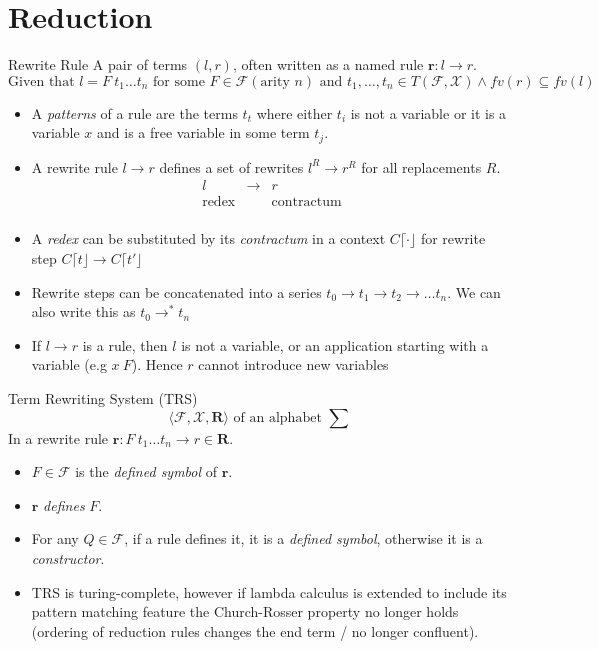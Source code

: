 \section{Reduction}
\begin{definitionbox}{Rewrite Rule}
	A pair of terms $(l, r)$, often written as a named rule $\mathbf{r} : l \to r$.
	\[\text{Given that }l = F \ t_1 \dots t_n \text{ for some }F \in \mathcal{F} (\text{arity }n) \text{ and } t_1, \dots , t_n \in T(\mathcal{F}, \mathcal{X}) \land fv(r) \subseteq fv(l)\]
	\begin{itemize}
		\item A \textit{patterns} of a rule are the terms $t_t$ where either $t_i$ is not a variable or it is a variable $x$ and is a free variable in some term $t_j$.
		\item {A rewrite rule $l \to r$ defines a set of rewrites $l^R \to r^R$ for all replacements $R$.
		      \[\begin{matrix}
				      l            & \to & r                 \\
				      \text{redex} &     & \text{contractum} \\
			      \end{matrix}\]}
		\item A \textit{redex} can be substituted by its \textit{contractum} in a context $C\lceil \cdot \rfloor$ for rewrite step $C\lceil t \rfloor \to C \lceil t' \rfloor$
		\item Rewrite steps can be concatenated into a series $t_0 \to t_1 \to t_2 \to \dots t_n$. We can also write this as $t_0 \to^* t_n$
		\item If $l \to r$ is a rule, then $l$ is not a variable, or an application starting with a variable (e.g $x \ F$). Hence $r$ cannot introduce new variables
	\end{itemize}
\end{definitionbox}

\begin{definitionbox}{Term Rewriting System (TRS)}
	\[\langle \mathcal{F}, \mathcal{X}, \mathbf{R} \rangle \text{ of an alphabet } \sum\]
	In a rewrite rule $\mathbf{r} : F \ t_1 \dots t_n \to r \in \mathbf{R}$.
	\begin{itemize}
		\item $F \in \mathcal{F}$ is the \textit{defined symbol} of $\mathbf{r}$.
		\item $\mathbf{r}$ \textit{defines} $F$.
		\item For any $Q \in \mathcal{F}$, if a rule defines it, it is a \textit{defined symbol}, otherwise it is a \textit{constructor}.
		\item TRS is turing-complete, however if lambda calculus is extended to include its pattern matching feature the Church-Rosser property no longer holds (ordering of reduction rules changes the end term / no longer confluent).
	\end{itemize}
\end{definitionbox}

